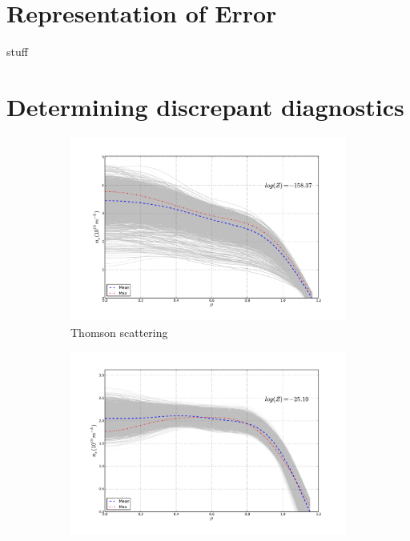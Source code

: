 \documentclass[12pt]{article}
\numberwithin{equation}{section}
\begin{document}
\section{Representation of Error}
stuff
\section{Determining discrepant diagnostics}
\begin{figure}[ht]
	\centering
	\begin{subfigure}[b]{0.5\textwidth}
		\centering
		\includegraphics[width=\textwidth,keepaspectratio=true]{figures/bfit146102_00505_thom5}
		\vspace{-30pt}
		\caption{Thomson scattering}
		\label{fig:ts505}
	\end{subfigure}
	\hspace{-20pt}
	\begin{subfigure}[b]{0.5\textwidth}
		\centering
		\includegraphics[width=\textwidth,keepaspectratio=true]{figures/bfit146102_00505_inter5}

\end{subfigure}
\end{figure}
\end{document}
